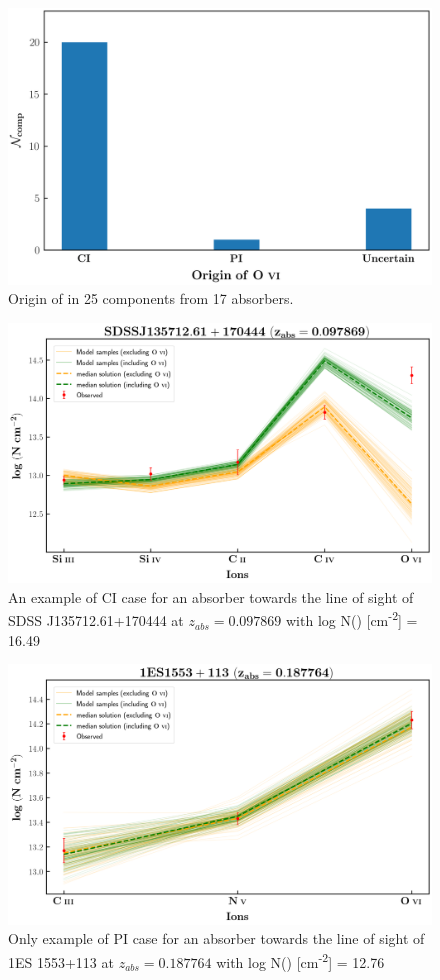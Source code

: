 \begin{figure}
    \centering
    \includegraphics[width=0.9\linewidth]{Figures/OVI_cases.png}
    \caption{Origin of  in 25 components from 17  absorbers.}
    \label{fig:OVI-origin}
\end{figure}


\begin{figure}
    \centering
    \includegraphics[width=0.9\linewidth]{Figures/s135712-z=0.097869-compII.png}
    \caption{An example of CI case for an absorber towards the line of sight of SDSS J135712.61+170444 at $z_{abs}=0.097869$ with log N() [cm\textsuperscript{-2}] = 16.49}
    \label{fig:ex-CI}
\end{figure}

\begin{figure}
    \centering
    \includegraphics[width=0.9\linewidth]{Figures/1es1553-z=0.187764-compI.png}
    \caption{Only example of PI case for an absorber towards the line of sight of 1ES 1553+113 at $z_{abs}=0.187764$ with log N() [cm\textsuperscript{-2}] = 12.76}
    \label{fig:ex-PI}
\end{figure}


